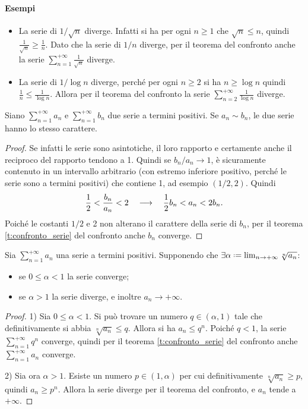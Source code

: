 \paragraph{Esempi}
\begin{itemize}
\item La serie di $1/\sqrt{n}$ diverge. Infatti si ha per ogni $n\geq 1$ che $\sqrt{n}\leq n$, quindi $\frac1{\sqrt{n}}\geq\frac1{n}$. Dato che la serie di $1/n$ diverge, per il teorema del confronto anche la serie $\sum_{n=1}^{+\infty}\frac1{\sqrt{n}}$ diverge.
\item La serie di $1/\log n$ diverge, perché per ogni $n\geq 2$ si ha $n\geq\log n$ quindi $\frac1{n}\leq\frac1{\log n}$. Allora per il teorema del confronto la serie $\sum_{n=2}^{+\infty}\frac1{\log n}$ diverge.
\end{itemize}
\begin{corollario}
\label{c:confronto_asintotico}
Siano $\sum_{n=1}^{+\infty}a_n$ e $\sum_{n=1}^{+\infty}b_n$ due serie a termini positivi. Se $a_n\sim b_n$, le due serie hanno lo stesso carattere.
\begin{proof}
Se infatti le serie sono asintotiche, il loro rapporto e certamente anche il reciproco del rapporto tendono a 1. Quindi se $b_n/a_n\to 1$, è sicuramente contenuto in un intervallo arbitrario (con estremo inferiore positivo, perché le serie sono a termini positivi) che contiene 1, ad esempio $(1/2,2)$. Quindi
\[
\frac12<\frac{b_n}{a_n}<2\quad\longrightarrow\quad\frac12b_n<a_n<2b_n.
\]
Poiché le costanti $1/2$ e 2 non alterano il carattere della serie di $b_n$, per il teorema \ref{t:confronto_serie} del confronto anche $b_n$ converge.
\end{proof}
\end{corollario}
\begin{teorema}
\label{t:criterio_radice_serie}
Sia $\sum_{n=1}^{+\infty}a_n$ una serie a termini positivi. Supponendo che $\exists\alpha\defeq\lim_{n\to+\infty}\sqrt[n]{a_n}$:
\begin{itemize}
\item se $0\leq\alpha<1$ la serie converge;
\item se $\alpha>1$ la serie diverge, e inoltre $a_n\to+\infty$.
\end{itemize}
\end{teorema}
\begin{proof}
1) Sia $0\leq\alpha<1$. Si può trovare un numero $q\in(\alpha,1)$ tale che definitivamente si abbia $\sqrt[n]{a_n}\leq q$. Allora si ha $a_n\leq q^n$. Poiché $q<1$, la serie $\sum_{n=1}^{+\infty}q^n$ converge, quindi per il teorema \ref{t:confronto_serie} del confronto anche $\sum_{n=1}^{+\infty}a_n$ converge.

2) Sia ora $\alpha>1$. Esiste un numero $p\in(1,\alpha)$ per cui definitivamente $\sqrt[n]{a_n}\geq p$, quindi $a_n\geq p^n$. Allora la serie diverge per il teorema del confronto, e $a_n$ tende a $+\infty$.
\end{proof}
